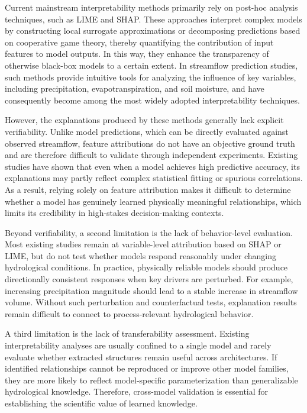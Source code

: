 Current mainstream interpretability methods primarily rely on post-hoc analysis techniques, such as LIME\cite{Ribeiro2016_LIME_Origin} and SHAP\cite{lundberg2017_Shap_Origin}. These approaches interpret complex models by constructing local surrogate approximations or decomposing predictions based on cooperative game theory\cite{Clark2025_Shap}, thereby quantifying the contribution of input features to model outputs. In this way, they enhance the transparency of otherwise black-box models to a certain extent\cite{Wagan2026_LIME}. In streamflow prediction studies, such methods provide intuitive tools for analyzing the influence of key variables, including precipitation, evapotranspiration, and soil moisture, and have consequently become among the most widely adopted interpretability techniques.

However, the explanations produced by these methods generally lack explicit verifiability\cite{NEURIPS2021_shap_residuals}. Unlike model predictions, which can be directly evaluated against observed streamflow, feature attributions do not have an objective ground truth and are therefore difficult to validate through independent experiments\cite{TAKEFUJI2026_Shap_problem}. Existing studies have shown that even when a model achieves high predictive accuracy, its explanations may partly reflect complex statistical fitting or spurious correlations\cite{e24050687_Shap_problem}. As a result, relying solely on feature attribution makes it difficult to determine whether a model has genuinely learned physically meaningful relationships\cite{Benchmarkingofa_PhysicallyBasedHydrologicModel}, which limits its credibility in high-stakes decision-making contexts.

Beyond verifiability, a second limitation is the lack of behavior-level evaluation. Most existing studies remain at variable-level attribution based on SHAP or LIME\cite{ZHOU2026103254,XIA2026103232}, but do not test whether models respond reasonably under changing hydrological conditions\cite{10.2166/wcc.2017.149}. In practice, physically reliable models should produce directionally consistent responses\cite{hess-30-1077-2026} when key drivers are perturbed. For example, increasing precipitation magnitude should lead to a stable increase in streamflow volume\cite{nearing2021role}. Without such perturbation and counterfactual tests\cite{simic2025perturbation,ZHANG2025123192}, explanation results remain difficult to connect to process-relevant hydrological behavior\cite{read2019process}.

A third limitation is the lack of transferability assessment. Existing interpretability analyses are usually confined to a single model and rarely evaluate whether extracted structures remain useful across architectures\cite{pmlr-v235-wang24j}. If identified relationships cannot be reproduced or improve other model families, they are more likely to reflect model-specific parameterization than generalizable hydrological knowledge. Therefore, cross-model validation is essential for establishing the scientific value of learned knowledge\cite{li2022transferability}.

